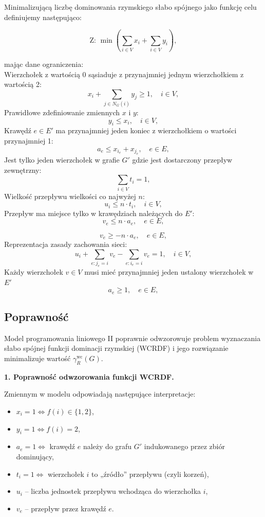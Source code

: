 Minimalizującą liczbę dominowania rzymskiego słabo spójnego jako funkcję celu definiujemy następująco:

\[
\text{Z: } \min \left( \sum_{i \in V} x_i + \sum_{i \in V} y_i \right),
\]

mając dane ograniczenia:\\
Wierzchołek z wartością 0 sąsiaduje z przynajmniej jednym wierzchołkiem z wartością 2:
\[
x_i + \sum_{j \in N_G(i)} y_j \geq 1, \quad i \in V, \tag{1}
\]
Prawidłowe zdefiniowanie zmiennych $x$ i $y$:
\[
y_i \leq x_i, \quad i \in V, \tag{2}
\]
Krawędź $e \in E'$ ma przynajmniej jeden koniec z wierzchołkiem o wartości przynajmniej 1:
\[
a_e \leq x_{i_e} + x_{j_e}, \quad e \in E, \tag{3}
\]
Jest tylko jeden wierzchołek w grafie $G'$ gdzie jest dostarczony przepływ zewnętrzny:
\[
\sum_{i \in V} t_i = 1, \tag{4}
\]
Wielkość przepływu wielkości co najwyżej $n$:
\[
u_i \leq n \cdot t_i, \quad i \in V, \tag{5}
\]
Przepływ ma miejsce tylko w krawędziach należących do $E'$:
\[
v_e \leq n \cdot a_e, \quad e \in E, \tag{6}
\]

\[
v_e \geq -n \cdot a_e, \quad e \in E, \tag{7}
\]
Reprezentacja zasady zachowania sieci:
\[
u_i + \sum_{e: j_e = i} v_e - \sum_{e: i_e = i} v_e = 1, \quad i \in V, \tag{8}
\]
Każdy wierzchołek $v \in V$ musi mieć przynajmniej jeden ustalony wierzchołek w $E'$
\[
a_e \geq 1, \quad e \in E, \tag{9}
\]

\subsection{Poprawność}

Model programowania liniowego II poprawnie odwzorowuje problem wyznaczania słabo spójnej funkcji dominacji rzymskiej (WCRDF) i jego rozwiązanie minimalizuje wartość $\gamma_R^{\text{wc}}(G)$.

\textbf{1. Poprawność odwzorowania funkcji WCRDF.}

Zmiennym w modelu odpowiadają następujące interpretacje:
\begin{itemize}
    \item $x_i = 1 \iff f(i) \in \{1,2\}$,
    \item $y_i = 1 \iff f(i) = 2$,
    \item $a_e = 1 \iff$ krawędź $e$ należy do grafu $G'$ indukowanego przez zbiór dominujący,
    \item $t_i = 1 \iff$ wierzchołek $i$ to „źródło” przepływu (czyli korzeń),
    \item $u_i$ – liczba jednostek przepływu wchodząca do wierzchołka $i$,
    \item $v_e$ – przepływ przez krawędź $e$.
\end{itemize}

